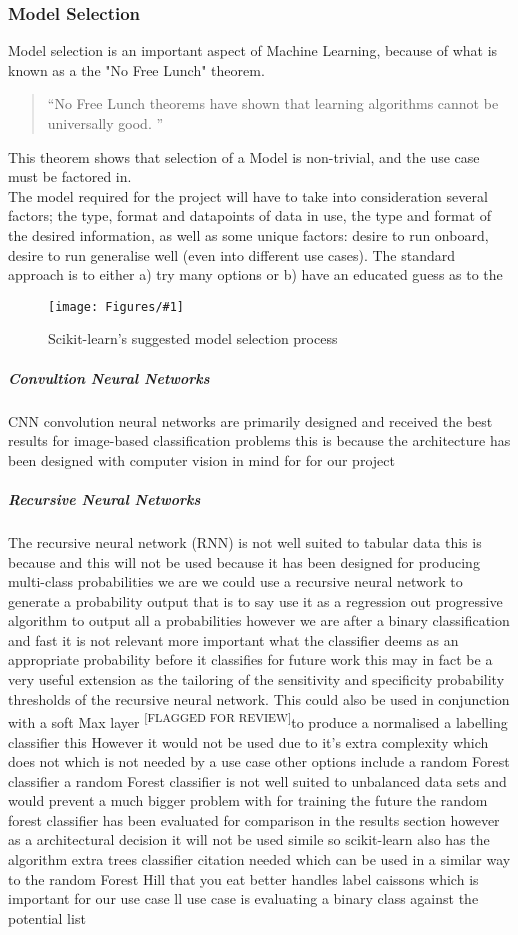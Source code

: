 \documentclass{UoNMCHA}
\newcommand{\flagforreview}{\textsuperscript{\color{red} [FLAGGED FOR REVIEW]}}
\newcommand{\inlineQuote}[1]{``#1''}
\newcommand{\fancyquote}[1]{\begin{quotation}\inlineQuote{#1}\end{quotation}}
\newcommand{\fFigure}[3]{
	\begin{figure}[h]
        \begin{center}  
            \texttt{[image: Figures/\#1]}  
            \caption{#2}
            \label{#1}
        \end{center}
	\end{figure}
}
\numberwithin{equation}{section}
\begin{document}
\subsubsection{Model Selection}
Model selection is an important aspect of Machine Learning, because of what is known as a the "No Free Lunch" theorem. 
\fancyquote{No Free Lunch theorems have shown that learning algorithms cannot be universally good. \cite{NFL_quote}}
This theorem shows that selection of a Model is non-trivial, and the use case must be factored in.\\

The model required for the project will have to take into consideration several factors; the type, format and datapoints of data in use, the type and format of the desired information, as well as some unique factors: desire to run onboard, desire to run generalise well (even into different use cases). The standard approach is to either a) try many options or b) have an educated guess as to the 

\fFigure{modelselection.png}{Scikit-learn's suggested model selection process}{0.8}


\subparagraph{Convultion Neural Networks}
CNN convolution neural networks are primarily designed and received the best results for image-based classification problems this is because the architecture has been designed with computer vision in mind for for our project

\subparagraph{Recursive Neural Networks}
The recursive neural network (RNN) is not well suited to tabular data this is because and this will not be used because it has been designed for producing multi-class probabilities we are we could use a recursive neural network to generate a probability output that is to say use it as a regression out progressive algorithm to output all a probabilities however we are after a binary classification and fast it is not relevant more important what the classifier deems as an appropriate probability before it classifies for future work this may in fact be a very useful extension as the tailoring of the sensitivity and specificity probability thresholds of the recursive neural network. This could also be used in conjunction with a soft Max layer\flagforreview to produce a normalised a labelling classifier this
However it would not be used due to it's extra complexity which does not which is not needed by a use case other options include a random Forest classifier a random Forest classifier is not well suited to unbalanced data sets and would prevent a much bigger problem with for training the future the random forest classifier has been evaluated for comparison in the results section however as a architectural decision it will not be used simile so scikit-learn also has the algorithm extra trees classifier citation needed which can be used in a similar way to the random Forest Hill that you eat better handles label caissons which is important for our use case ll use case is evaluating a binary class against the potential list
\end{document}
